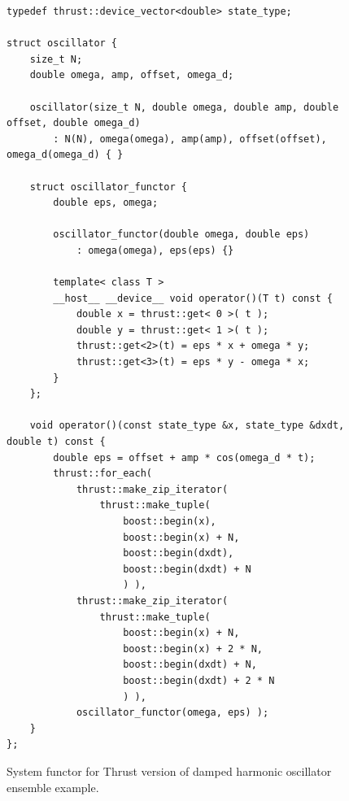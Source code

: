 \documentclass[1p]{elsarticle}
\begin{document}
\begin{figure}[p]
\begin{lstlisting}
typedef thrust::device_vector<double> state_type;

struct oscillator {
    size_t N;
    double omega, amp, offset, omega_d;

    oscillator(size_t N, double omega, double amp, double offset, double omega_d)
        : N(N), omega(omega), amp(amp), offset(offset), omega_d(omega_d) { }

    struct oscillator_functor {
        double eps, omega;

        oscillator_functor(double omega, double eps)
            : omega(omega), eps(eps) {}

        template< class T >
        __host__ __device__ void operator()(T t) const {
            double x = thrust::get< 0 >( t );
            double y = thrust::get< 1 >( t );
            thrust::get<2>(t) = eps * x + omega * y;
            thrust::get<3>(t) = eps * y - omega * x;
        }
    };

    void operator()(const state_type &x, state_type &dxdt, double t) const {
        double eps = offset + amp * cos(omega_d * t);
        thrust::for_each(
            thrust::make_zip_iterator(
                thrust::make_tuple(
                    boost::begin(x),
                    boost::begin(x) + N,
                    boost::begin(dxdt),
                    boost::begin(dxdt) + N 
                    ) ),
            thrust::make_zip_iterator(
                thrust::make_tuple(
                    boost::begin(x) + N,
                    boost::begin(x) + 2 * N,
                    boost::begin(dxdt) + N,
                    boost::begin(dxdt) + 2 * N
                    ) ),
            oscillator_functor(omega, eps) );
    }
};
\end{lstlisting}
\caption{System functor for Thrust version of damped harmonic oscillator
ensemble example.}
\label{code:thrust:damped}
\end{figure}
\end{document}

